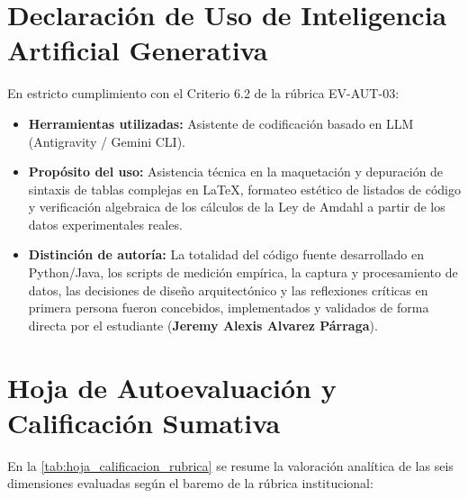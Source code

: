 \documentclass[11pt,a4paper]{article}
\begin{document}
\section{Declaración de Uso de Inteligencia Artificial Generativa}

En estricto cumplimiento con el Criterio 6.2 de la rúbrica EV-AUT-03:
\begin{itemize}
    \item \textbf{Herramientas utilizadas:} Asistente de codificación basado en LLM (Antigravity / Gemini CLI).
    \item \textbf{Propósito del uso:} Asistencia técnica en la maquetación y depuración de sintaxis de tablas complejas en LaTeX, formateo estético de listados de código y verificación algebraica de los cálculos de la Ley de Amdahl a partir de los datos experimentales reales.
    \item \textbf{Distinción de autoría:} La totalidad del código fuente desarrollado en Python/Java, los scripts de medición empírica, la captura y procesamiento de datos, las decisiones de diseño arquitectónico y las reflexiones críticas en primera persona fueron concebidos, implementados y validados de forma directa por el estudiante (\textbf{Jeremy Alexis Alvarez Párraga}).
\end{itemize}

\section{Hoja de Autoevaluación y Calificación Sumativa}

En la \cref{tab:hoja_calificacion_rubrica} se resume la valoración analítica de las seis dimensiones evaluadas según el baremo de la rúbrica institucional:
\end{document}

